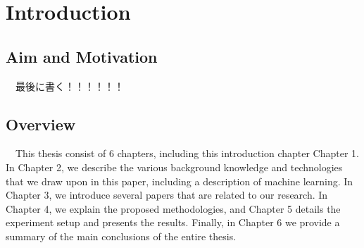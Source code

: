 \chapter{Introduction}
\section{Aim and Motivation}
　最後に書く！！！！！！
 


\section{Overview}
　This thesis consist of 6 chapters, including this introduction chapter Chapter 1.
In Chapter 2, we describe the various background knowledge and technologies that 
we draw upon in this paper, including a description of machine learning.
In Chapter 3, we introduce several papers that are related to our research.
In Chapter 4, we explain the proposed methodologies, and Chapter 5 details 
the experiment setup and presents the results.
Finally, in Chapter 6 we provide a summary of the main conclusions of 
the entire thesis.


